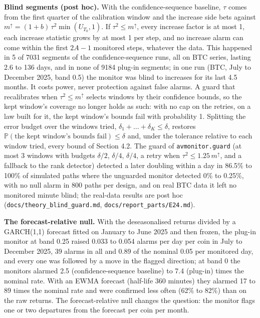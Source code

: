\documentclass[
]{article}
\begin{document}
\textbf{Blind segments (post hoc).} With the confidence-sequence
baseline, \(\tau\) comes from the first quarter of the calibration
window and the increase side bets against
\(m^{\uparrow} = (1+b)\,\tau^2\min(U_{T_0}, 1)\). If
\(\tau^2 \le m^{\uparrow}\), every increase factor is at most 1, each
increase statistic grows by at most 1 per step, and no increase alarm
can come within the first \(2A - 1\) monitored steps, whatever the data.
This happened in 5 of 7031 segments of the confidence-sequence runs, all
on BTC series, lasting 2.6 to 136 days, and in none of 9184 plug-in
segments; in one run (BTC, July to December 2025, band 0.5) the monitor
was blind to increases for its last 4.5 months. It costs power, never
protection against false alarms. A guard that recalibrates when
\(\tau^2 \le m^{\uparrow}\) selects windows by their confidence bounds,
so the kept window's coverage no longer holds as such: with no cap on
the retries, on a law built for it, the kept window's bounds fail with
probability 1. Splitting the error budget over the windows tried,
\(\delta_1 + \dots + \delta_K \le \delta\), restores
\(\mathbb{P}(\text{the kept window's bounds fail}) \le \delta\) and,
under the tolerance relative to each window tried, every bound of
Section 4.2. The guard of \texttt{avmonitor.guard} (at most 3 windows
with budgets \(\delta/2\), \(\delta/4\), \(\delta/4\), a retry when
\(\tau^2 \le 1.25\, m^{\uparrow}\), and a fallback to the rank detector)
detected a later doubling within a day in 86.5\% to 100\% of simulated
paths where the unguarded monitor detected 0\% to 0.25\%, with no null
alarm in 800 paths per design, and on real BTC data it left no monitored
minute blind; the real-data results are post hoc
(\texttt{docs/theory\_blind\_guard.md},
\texttt{docs/report\_parts/E24.md}).

\textbf{The forecast-relative null.} With the deseasonalised returns
divided by a GARCH(1,1) forecast fitted on January to June 2025 and then
frozen, the plug-in monitor at band 0.25 raised 0.033 to 0.054 alarms
per day per coin in July to December 2025, 39 alarms in all and 0.89 of
the nominal 0.05 per monitored day, and every one was followed by a move
in the flagged direction; at band 0 the monitors alarmed 2.5
(confidence-sequence baseline) to 7.4 (plug-in) times the nominal rate.
With an EWMA forecast (half-life 360 minutes) they alarmed 17 to 89
times the nominal rate and were confirmed less often (62\% to 82\%) than
on the raw returns. The forecast-relative null changes the question: the
monitor flags one or two departures from the forecast per coin per
month.
\end{document}

